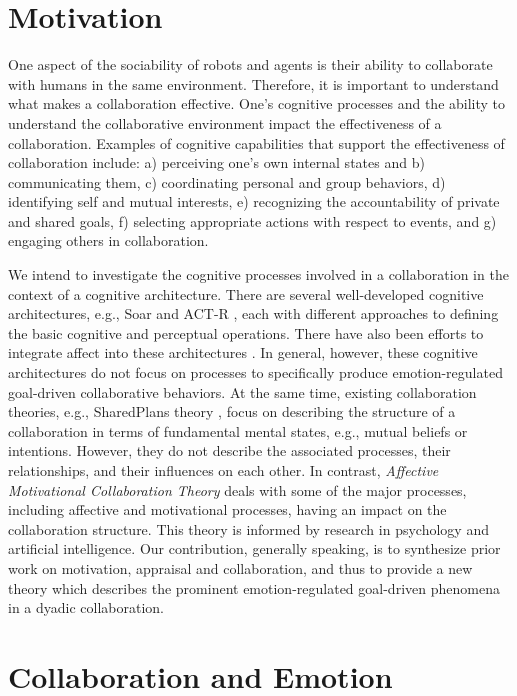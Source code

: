 \documentclass[letterpaper]{article}
\begin{document}
\section{Motivation}


One aspect of the sociability of robots and agents is their ability to
collaborate with humans in the same environment. Therefore, it is important to
understand what makes a collaboration effective. One's cognitive processes and
the ability to understand the collaborative environment impact the effectiveness
of a collaboration. Examples of cognitive capabilities that support the
effectiveness of collaboration include: a) perceiving one's own internal states
and b) communicating them, c) coordinating personal and group behaviors, d)
identifying self and mutual interests, e) recognizing the accountability of
private and shared goals, f) selecting appropriate actions with respect to
events, and g) engaging others in collaboration.

We intend to investigate the cognitive processes involved in a collaboration in
the context of a cognitive architecture. There are several well-developed
cognitive architectures, e.g., Soar \cite{laird:soar} and ACT-R
\cite{anderson:act-r}, each with different approaches to defining the basic
cognitive and perceptual operations. There have also been efforts to integrate
affect into these architectures
\cite{dancy:actR-physiology-affect,marinier:behavior-emotion}. In general,
however, these cognitive architectures do not focus on processes to specifically
produce emotion-regulated goal-driven collaborative behaviors. At the same time,
existing collaboration theories, e.g., SharedPlans theory
\cite{grosz:plans-discourse}, focus on describing the structure of a
collaboration in terms of fundamental mental states, e.g., mutual beliefs or
intentions. However, they do not describe the associated processes, their
relationships, and their influences on each other. In contrast,
\textit{Affective Motivational Collaboration Theory} deals with some of the
major processes, including affective and motivational processes, having an
impact on the collaboration structure. This theory is informed by research in
psychology and artificial intelligence. Our contribution, generally speaking, is
to synthesize prior work on motivation, appraisal and collaboration, and thus to
provide a new theory which describes the prominent emotion-regulated goal-driven
phenomena in a dyadic collaboration.

\section{Collaboration and Emotion}
\end{document}
